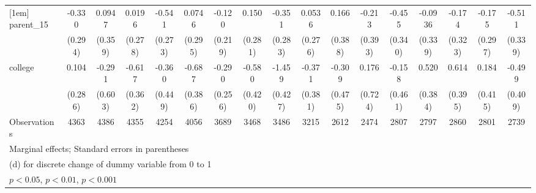 {\begin{tabular}{l*{16}{c}}
[1em]
parent\_15           &      -0.330         &      0.0947         &      0.0196         &      -0.541\sym{*}  &      0.0746         &      -0.120         &       0.150         &      -0.351         &      0.0536         &       0.166         &      -0.213         &      -0.455         &     -0.0936         &      -0.174         &      -0.175         &      -0.511         \\
                    &     (0.294)         &     (0.359)         &     (0.278)         &     (0.273)         &     (0.295)         &     (0.219)         &     (0.281)         &     (0.283)         &     (0.276)         &     (0.388)         &     (0.393)         &     (0.340)         &     (0.339)         &     (0.323)         &     (0.297)         &     (0.339)         \\
[1em]
college             &       0.104         &      -0.291         &      -0.617         &      -0.360         &      -0.687         &      -0.290         &      -0.580         &      -1.459\sym{***}&      -0.371         &      -0.309         &       0.176         &      -0.158         &       0.520         &       0.614         &       0.184         &      -0.499         \\
                    &     (0.286)         &     (0.603)         &     (0.362)         &     (0.449)         &     (0.386)         &     (0.256)         &     (0.420)         &     (0.427)         &     (0.381)         &     (0.475)         &     (0.724)         &     (0.461)         &     (0.384)         &     (0.395)         &     (0.415)         &     (0.409)         \\
\hline
Observations        &        4363         &        4386         &        4355         &        4254         &        4056         &        3689         &        3468         &        3486         &        3215         &        2612         &        2474         &        2807         &        2797         &        2860         &        2801         &        2739         \\
\hline\hline
\multicolumn{17}{l}{\footnotesize Marginal effects; Standard errors in parentheses}\\
\multicolumn{17}{l}{\footnotesize  (d) for discrete change of dummy variable from 0 to 1}\\
\multicolumn{17}{l}{\footnotesize \sym{*} \(p<0.05\), \sym{**} \(p<0.01\), \sym{***} \(p<0.001\)}\\
\end{tabular}
}

